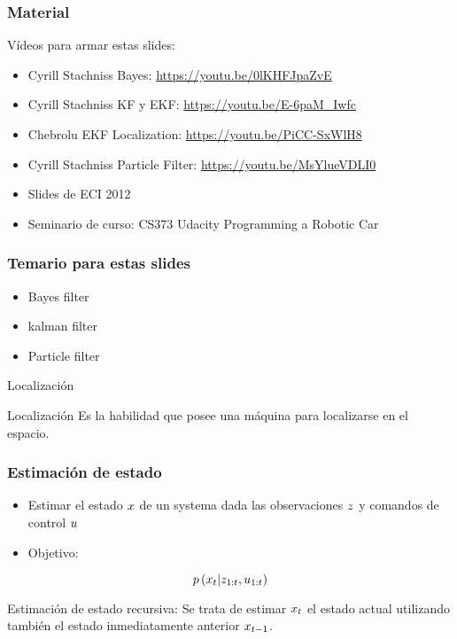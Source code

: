 \begin{frame}
    \frametitle{Material}
    
    Vídeos para armar estas slides:
    \begin{itemize}
        \item Cyrill Stachniss Bayes: \url{https://youtu.be/0lKHFJpaZvE}
        \item Cyrill Stachniss KF y EKF: \url{https://youtu.be/E-6paM_Iwfc}
        \item Chebrolu EKF Localization: \url{https://youtu.be/PiCC-SxWlH8}
        \item Cyrill Stachniss Particle Filter: \url{https://youtu.be/MsYlueVDLI0}
        \item Slides de ECI 2012
        \item Seminario de curso: CS373 Udacity Programming a Robotic Car
    \end{itemize}
    
\end{frame}

\begin{frame}
    \frametitle{Temario para estas slides}
    
    \begin{itemize}
        \item Bayes filter
        \item kalman filter
        \item Particle filter
    \end{itemize}
    
    
\end{frame}

\begin{frame}{Localización}
	\begin{block}{Localización}
		Es la habilidad que posee una máquina para localizarse en el espacio.
	\end{block}
\end{frame}


\begin{frame}
	\frametitle{Estimación de estado}
	
	
	\begin{itemize}
		\item  Estimar el estado $x$ de un systema dada las observaciones $z$ y comandos de control $u$
		\item Objetivo:
	\end{itemize}
	
	\begin{equation}
		p\left(x_{t} | z_{1:t}, u_{1:t} \right)
	\end{equation}
	
	Estimación de estado recursiva: Se trata de estimar $x_{t}$ el estado actual utilizando también el estado inmediatamente anterior $x_{t-1}$.
\end{frame}

